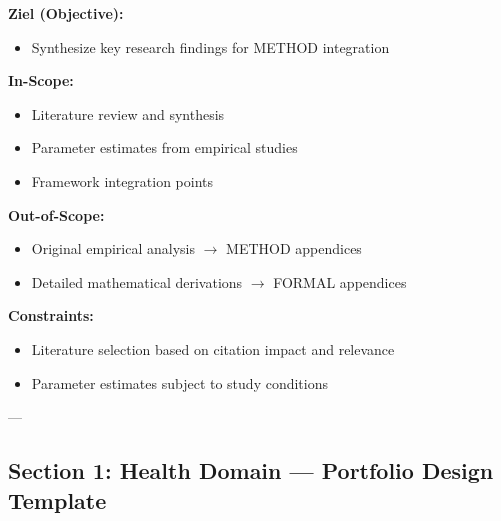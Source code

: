\begin{abstract}
This appendix provides a systematic review and integration of key research findings
in the METHOD domain. It synthesizes literature relevant to the Evidence-Based
Framework (EBF) and identifies connections to the 10C CORE architecture.
\end{abstract}


\begin{tcolorbox}[
    colback=orange!5!white,
    colframe=orange!75!black,
    title={\textbf{Appendix Scope: Ziel / In-Scope / Out-of-Scope / Constraints}},
    fonttitle=\bfseries
]

\textbf{Ziel (Objective):}
\begin{itemize}[nosep]
    \item Synthesize key research findings for METHOD integration
\end{itemize}

\textbf{In-Scope:}
\begin{itemize}[nosep]
    \item Literature review and synthesis
    \item Parameter estimates from empirical studies
    \item Framework integration points
\end{itemize}

\textbf{Out-of-Scope:}
\begin{itemize}[nosep]
    \item Original empirical analysis $\rightarrow$ METHOD appendices
    \item Detailed mathematical derivations $\rightarrow$ FORMAL appendices
\end{itemize}

\textbf{Constraints:}
\begin{itemize}[nosep]
    \item Literature selection based on citation impact and relevance
    \item Parameter estimates subject to study conditions
\end{itemize}

\end{tcolorbox}

---


\subsection*{Section 1: Health Domain — Portfolio Design Template}

